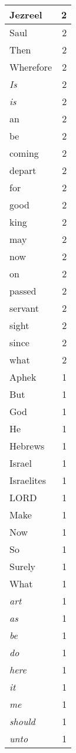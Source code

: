 \begin{center}
\begin{longtable}{l|r}
Jezreel & 2 \\ \hline
Saul & 2 \\ \hline
Then & 2 \\ \hline
Wherefore & 2 \\ \hline
\emph{Is} & 2 \\ \hline
\emph{is} & 2 \\ \hline
an & 2 \\ \hline
be & 2 \\ \hline
coming & 2 \\ \hline
depart & 2 \\ \hline
for & 2 \\ \hline
good & 2 \\ \hline
king & 2 \\ \hline
may & 2 \\ \hline
now & 2 \\ \hline
on & 2 \\ \hline
passed & 2 \\ \hline
servant & 2 \\ \hline
sight & 2 \\ \hline
since & 2 \\ \hline
what & 2 \\ \hline
Aphek & 1 \\ \hline
But & 1 \\ \hline
God & 1 \\ \hline
He & 1 \\ \hline
Hebrews & 1 \\ \hline
Israel & 1 \\ \hline
Israelites & 1 \\ \hline
LORD & 1 \\ \hline
Make & 1 \\ \hline
Now & 1 \\ \hline
So & 1 \\ \hline
Surely & 1 \\ \hline
What & 1 \\ \hline
\emph{art} & 1 \\ \hline
\emph{as} & 1 \\ \hline
\emph{be} & 1 \\ \hline
\emph{do} & 1 \\ \hline
\emph{here} & 1 \\ \hline
\emph{it} & 1 \\ \hline
\emph{me} & 1 \\ \hline
\emph{should} & 1 \\ \hline
\emph{unto} & 1 \\ \hline

\end{longtable}
\end{center}
